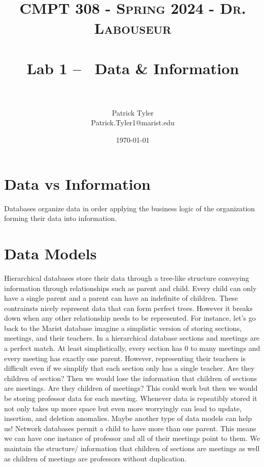 \documentclass[letterpaper, 10pt]{article}
\title{	
   \normalfont \normalsize 
   \textsc{CMPT 308 - Spring 2024 - Dr. Labouseur} \\[10pt] %
   \horrule{0.5pt} \\[0.25cm] 	%
   \huge Lab 1 -- ~Data \& Information\\     	    %
   \horrule{0.5pt} \\[0.25cm] 	%
}
\author{Patrick Tyler \\ \normalsize Patrick.Tyler1@marist.edu}
\date{\normalsize\today} 	%
\begin{document}
\maketitle %


\section{Data vs Information}
Databases organize data in order applying the business logic of the organization
   forming their data into information.
\section{Data Models}
Hierarchical databases store their data through a tree-like structure conveying
   information through relationships such as parent and child. 
Every child can only have a single parent and a parent can have an indefinite
   of children.
These contrainsts nicely represent data that can form perfect trees.
However it breaks down when any other relationship needs to be represented. 
For instance, let's go back to the Marist database imagine a simplistic version
   of storing sections, meetings, and their teachers.
In a hierarchical database sections and meetings are a perfect match.
At least simplistically, every section has 0 to many meetings and every
   meeting has exactly one parent.
However, representing their teachers is difficult even if we simplify that
   each section only has a single teacher.
Are they children of section?
Then we would lose the information that children of sections are meetings.
Are they children of meetings?
This could work but then we would be storing professor data for each meeting.
Whenever data is repeatibly stored it not only takes up more space but even more
   worryingly can lead to update, insertion, and deletion anomalies.
\newline
\newline
Maybe another type of data models can help us!
Network databases permit a child to have more than one parent.
This means we can have one instance of professor and all of their 
   meetings point to them.
We maintain the structure/ information that children of sections are meetings
   as well as children of meetings are professors without duplication.
\end{document}
